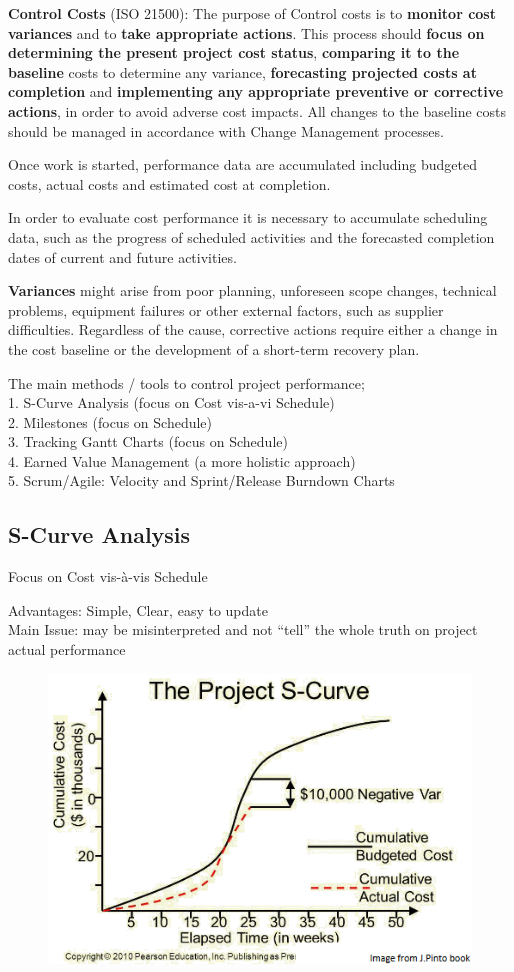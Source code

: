 \documentclass[]{project_plan}
\begin{document}
\textbf{Control Costs} (ISO 21500): The purpose of Control costs is to \textbf{monitor cost variances} and to \textbf{take appropriate
  actions}. This process should \textbf{focus on determining the present project cost status}, \textbf{comparing it to the baseline}
costs to determine any variance, \textbf{forecasting projected costs at completion} and \textbf{implementing any appropriate
  preventive or corrective actions}, in order to avoid adverse cost impacts. All changes to the baseline costs
should be managed in accordance with Change Management processes.

Once work is started, performance data are accumulated including budgeted costs, actual costs and estimated
cost at completion.

In order to evaluate cost performance it is necessary to accumulate scheduling data, such
as the progress of scheduled activities and the forecasted completion dates of current and future activities.

\textbf{Variances} might arise from poor planning, unforeseen scope changes, technical problems, equipment failures
or other external factors, such as supplier difficulties. Regardless of the cause, corrective actions require either
a change in the cost baseline or the development of a short-term recovery plan.

The main methods / tools to control project performance;\\
1. S-Curve Analysis (focus on Cost vis-a-vi Schedule)\\
2. Milestones (focus on Schedule)\\
3. Tracking Gantt Charts (focus on Schedule)\\
4. Earned Value Management (a more holistic approach)\\
5. Scrum/Agile: Velocity and Sprint/Release Burndown Charts

\subsection{S-Curve Analysis}

Focus on Cost vis-{\`a}-vis Schedule

Advantages: Simple, Clear, easy to update\\
Main Issue: may be misinterpreted and not “tell” the whole truth on project actual performance

\begin{figure}[H]
  \centering
  \includegraphics[width=.6\linewidth]{s curve analysis.png}
\end{figure}
\end{document}

